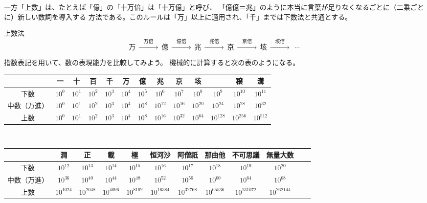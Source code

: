 \documentclass[dvipdfmx]{jsarticle}
\makeatletter
\def\JOcuurentChar{\xksj@Jo@command}%
\makeatother
\begin{document}
一方「上数」は、たとえば「億」の「十万倍」は「十万億」と呼び、
「億億＝兆」のように本当に言葉が足りなくなるごとに（二乗ごとに）新しい数詞を導入する
方法である。このルールは「万」以上に適用され、「千」までは下数法と共通とする。
\begin{itembox}[l]{上数法}
\[
\text{万}
\ \xrightarrow{\quad\text{万倍}\quad}\ {}
\text{億}
\ \xrightarrow{\quad\text{億倍}\quad}\ {}
\text{兆}
\ \xrightarrow{\quad\text{兆倍}\quad}\ {}
\text{京}
\ \xrightarrow{\quad\text{京倍}\quad}\ {}
\text{垓}
\ \xrightarrow{\quad\text{垓倍}\quad}\ {}\ {}\cdots
\]
\end{itembox}
指数表記を用いて、数の表現能力を比較してみよう。
機械的に計算すると次の表のようになる。
\begin{center}
  \begin{tabular}{|c|c|c|c|c|c|c|c|c|c|c|c|c|}\hline
      &一&十&百&千&万&億&兆&京&垓&\JOcuurentChar&穣&溝\\\hline
    下数 & $10^0$  & $10^1$  & $10^2$  & $10^3$  & $10^4$  & $10^5$  & $10^6$  & $10^7$  & $10^8$  & $10^9$  & $10^{10}$ & $10^{11}$ \\\hline
    中数（万進）& $10^0$  & $10^1$  & $10^2$  & $10^3$  & $10^4$  & $10^8$  & $10^{12}$  & $10^{16}$  & $10^{20}$  & $10^{24}$  & $10^{28}$ & $10^{32}$ \\\hline
    上数& $10^0$  & $10^1$  & $10^2$  & $10^3$  & $10^4$  & $10^8$  & $10^{16}$  & $10^{32}$  & $10^{64}$  & $10^{128}$  & $10^{256}$ & $10^{512}$ \\\hline
  \end{tabular}
  \bigskip\\
  \begin{tabular}{|c|c|c|c|c|c|c|c|c|c|c|c|}\hline
     &澗&正&載&極&恒河沙&阿僧祇&那由他&不可思議&無量大数\\\hline
    下数 & $10^{12}$  & $10^{13}$  & $10^{14}$  & $10^{15}$  & $10^{16}$  & $10^{17}$  & $10^{18}$  & $10^{19}$  & $10^{20}$ \\\hline
    中数（万進）& $10^{36}$  & $10^{40}$  & $10^{44}$  & $10^{48}$  & $10^{52}$  & $10^{56}$  & $10^{60}$  & $10^{64}$  & $10^{68}$ \\\hline
    上数& $10^{1024}$  & $10^{2048}$  & $10^{4096}$  & $10^{8192}$  & $10^{16384}$  & $10^{32768}$  & $10^{65536}$  & $10^{131072}$  & $10^{262144}$ \\\hline
  \end{tabular}
\end{center}
\end{document}
